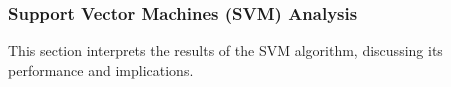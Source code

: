 \subsubsection{Support Vector Machines (SVM) Analysis}
\label{subsubsec:discussion-svm}

This section interprets the results of the SVM algorithm, discussing its performance and implications.


